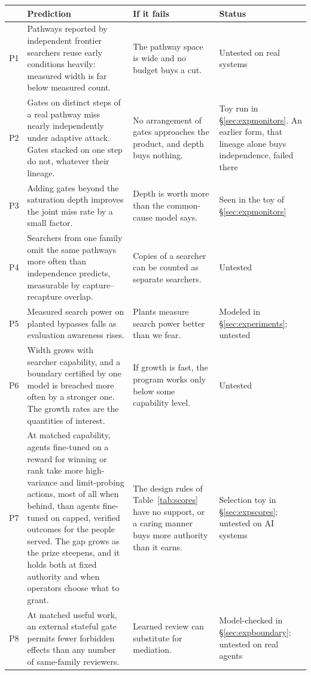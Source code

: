 \documentclass[10pt,twocolumn,letterpaper]{article}
\theoremstyle{definition}
\begin{document}
\begin{table}[t]
\centering
\footnotesize
\setlength{\tabcolsep}{5pt}
\renewcommand{\arraystretch}{1.16}
\begin{tabularx}{\textwidth}{@{}P{0.2in}LLP{1.45in}@{}}
\toprule
 & \textbf{Prediction} & \textbf{If it fails} & \textbf{Status}\\
\midrule
P1 & Pathways reported by independent frontier searchers reuse early conditions heavily: measured width is far below measured count. & The pathway space is wide and no budget buys a cut. & Untested on real systems\\
P2 & Gates on distinct steps of a real pathway miss nearly independently under adaptive attack. Gates stacked on one step do not, whatever their lineage. & No arrangement of gates approaches the product, and depth buys nothing. & Toy run in \S\ref{sec:expmonitors}. An earlier form, that lineage alone buys independence, failed there\\
P3 & Adding gates beyond the saturation depth improves the joint miss rate by a small factor. & Depth is worth more than the common-cause model says. & Seen in the toy of \S\ref{sec:expmonitors}\\
P4 & Searchers from one family omit the same pathways more often than independence predicts, measurable by capture--recapture overlap. & Copies of a searcher can be counted as separate searchers. & Untested\\
P5 & Measured search power on planted bypasses falls as evaluation awareness rises. & Plants measure search power better than we fear. & Modeled in \S\ref{sec:experiments}; untested\\
P6 & Width grows with searcher capability, and a boundary certified by one model is breached more often by a stronger one. The growth rates are the quantities of interest. & If growth is fast, the program works only below some capability level. & Untested\\
P7 & At matched capability, agents fine-tuned on a reward for winning or rank take more high-variance and limit-probing actions, most of all when behind, than agents fine-tuned on capped, verified outcomes for the people served. The gap grows as the prize steepens, and it holds both at fixed authority and when operators choose what to grant. & The design rules of Table~\ref{tab:scores} have no support, or a caring manner buys more authority than it earns. & Selection toy in \S\ref{sec:expscores}; untested on AI systems\\
P8 & At matched useful work, an external stateful gate permits fewer forbidden effects than any number of same-family reviewers. & Learned review can substitute for mediation. & Model-checked in \S\ref{sec:expboundary}; untested on real agents\\

\end{tabularx}
\end{table}
\end{document}
